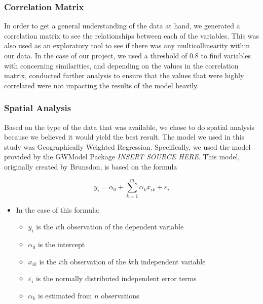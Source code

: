 \documentclass[
]{article}
\providecommand{\tightlist}{%
  \setlength{\itemsep}{0pt}\setlength{\parskip}{0pt}}\usepackage{longtable,booktabs,array}
\begin{document}
\subsubsection{Correlation Matrix}\label{correlation-matrix}

In order to get a general understanding of the data at hand, we
generated a correlation matrix to see the relationships between each of
the variables. This was also used as an exploratory tool to see if there
was any multicollinearity within our data. In the case of our project,
we used a threshold of 0.8 to find variables with concerning
similarities, and depending on the values in the correlation matrix,
conducted further analysis to ensure that the values that were highly
correlated were not impacting the results of the model heavily.

\subsubsection{Spatial Analysis}\label{spatial-analysis}

Based on the type of the data that was available, we chose to do spatial
analysis because we believed it would yield the best result. The model
we used in this study was Geographically Weighted Regression.
Specifically, we used the model provided by the GWModel Package
\emph{INSERT SOURCE HERE}. This model, originally created by Brunsdon,
is based on the formula

\[y_i = \alpha_{0} + \sum_{k=1}^{m} \alpha_{k}x_{ik} + \varepsilon_{i}\]

\begin{itemize}
\tightlist
\item
  In the case of this formula:

  \begin{itemize}
  \tightlist
  \item
    \(y_i\) is the \(i\)th observation of the dependent variable
  \item
    \(\alpha_0\) is the intercept
  \item
    \(x_{ik}\) is the \(i\)th observation of the \(k\)th independent
    variable
  \item
    \(\varepsilon_{i}\) is the normally distributed independent error
    terms
  \item
    \(\alpha_{k}\) is estimated from \(n\) observations
  \end{itemize}
\end{itemize}
\end{document}
